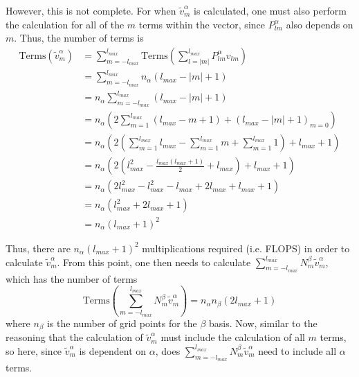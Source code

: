 \documentclass{revtex4-1}
\begin{document}
However, this is not complete. For when $\tilde{v}_{m}^{\alpha}$ is calculated, one must also perform the calculation for all of the $m$ terms within the vector, since $P_{lm}^{\alpha}$ also depends on $m$. Thus, the number of terms is 
\begin{align}
\mbox{Terms}\!\left(\tilde{v}_{m}^{\alpha}\right) 	&= \sum_{m=-l_{max}}^{l_{max}}\mbox{Terms}\!\left(\sum_{l=|m|}^{l_{max}}P_{lm}^{\alpha}v_{lm}\right) \\
													&= \sum_{m=-l_{max}}^{l_{max}}n_{\alpha}\left(l_{max}-|m|+1\right)\\
													&= n_{\alpha}\sum_{m=-l_{max}}^{l_{max}}\left(l_{max}-|m|+1\right)\\
													&= n_{\alpha}\left(2\sum_{m=1}^{l_{max}}\left(l_{max}-m+1\right) + \left(l_{max}-|m|+1\right)_{m=0}\right) \\
													&= n_{\alpha}\left(2\left(\sum_{m=1}^{l_{max}}l_{max}-\sum_{m=1}^{l_{max}}m+\sum_{m=1}^{l_{max}}1\right) + l_{max}+1\right) \\
													&= n_{\alpha}\left(2\left(l_{max}^{2}-\frac{l_{max}\left(l_{max}+1\right)}{2}+l_{max}\right) + l_{max}+1\right) \\
													&= n_{\alpha}\left(2l_{max}^{2}-l_{max}^{2}-l_{max}+2l_{max}+l_{max}+1\right)\\
													&= n_{\alpha}\left(l_{max}^{2}+2l_{max}+1\right) \\
													&= n_{\alpha}\left(l_{max}+1\right)^{2}
\end{align}

Thus, there are $n_{\alpha}\left(l_{max}+1\right)^{2}$ multiplications required (i.e. FLOPS) in order to calculate $\tilde{v}_{m}^{\alpha}$. From this point, one then needs to calculate $\sum_{m=-l_{max}}^{l_{max}}N_{m}^{\beta}\tilde{v}_{m}^{\alpha}$, which has the number of terms
\begin{equation}\label{E:GaussQuadLinRotPotPartSumOutSum}
\mbox{Terms}\!\left(\sum_{m=-l_{max}}^{l_{max}}N_{m}^{\beta}\tilde{v}_{m}^{\alpha}\right) = n_{\alpha}n_{\beta}\left(2l_{max}+1\right)
\end{equation}
where $n_{\beta}$ is the number of grid points for the $\beta$ basis. Now, similar to the reasoning that the calculation of $\tilde{v}_{m}^{\alpha}$ must include the calculation of all $m$ terms, so here, since $\tilde{v}_{m}^{\alpha}$ is dependent on $\alpha$, does $\sum_{m=-l_{max}}^{l_{max}}N_{m}^{\beta}\tilde{v}_{m}^{\alpha}$ need to include all $\alpha$ terms.
\end{document}
